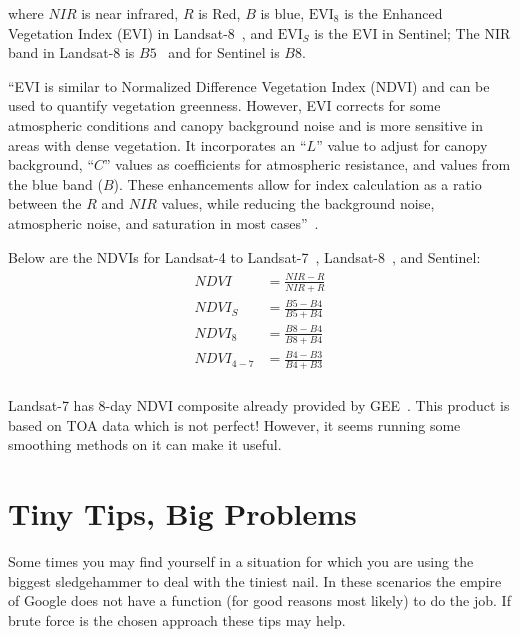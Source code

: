 \documentclass{article}
\newcommand{\NDVI}{N\!D\!V\!I}
\newcommand{\NIR}{N\!I\!R}
\begin{document}
\noindent where $NIR$ is near infrared, $R$ is Red,
$B$ is blue, 
$\text{EVI}_8$ is the Enhanced Vegetation Index (EVI) 
in Landsat-8~\cite{Landsat8EVI}, 
and $\text{EVI}_S$
is the EVI in Sentinel; The NIR band in
Landsat-8 is $B5$~\cite{L8BandNames}
and for Sentinel is $B8$.

``EVI is similar to Normalized Difference 
Vegetation Index (NDVI) and can be used 
to quantify vegetation greenness. However, 
EVI corrects for some atmospheric conditions 
and canopy background noise and is more 
sensitive in areas with dense vegetation. 
It incorporates an ``$L$'' value to adjust for 
canopy background, ``$C$'' values as coefficients 
for atmospheric resistance, and values from 
the blue band ($B$).  These enhancements allow 
for index calculation as a ratio between 
the $R$ and $NIR$ values, while reducing the 
background noise, atmospheric noise, and 
saturation in most cases''~\cite{Landsat8EVI}.

Below are the NDVIs for 
Landsat-4 to Landsat-7~\cite{Landsat4NDVI},
Landsat-8~\cite{Landsat4NDVI}, and Sentinel:
\begin{gather}
\label{eq:NDVILandsat8}
\begin{aligned}
\NDVI &= \frac{\NIR - R}{\NIR + R}\\
\NDVI_S &= \frac{B5 - B4}{B5 + B4}\\
\NDVI_8 &= \frac{B8 - B4}{B8 + B4} \\
\NDVI_{4-7} &= \frac{B4 - B3}{B4 + B3} \\
\end{aligned}
\end{gather}

Landsat-7 has 8-day NDVI composite already provided 
by GEE~\cite{Landsat7NDVIComposite}. This product
is based on TOA data which is not perfect! However,
it seems running some smoothing methods on it can
make it useful.


\section{Tiny Tips, Big Problems}
\label{sec:Tiny-Tips-Big-Problems}

Some times you may find yourself in a situation
for which you are using the biggest sledgehammer to deal
with the tiniest nail. In these scenarios the empire of Google
does not have a function (for good reasons most likely) to do the job. 
If brute force is the chosen approach these tips may help.
\end{document}
